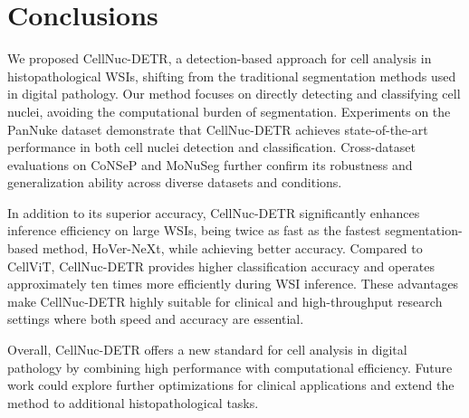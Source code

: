 \section{Conclusions}
We proposed CellNuc-DETR, a detection-based approach for cell analysis in histopathological WSIs, shifting from the traditional segmentation methods used in digital pathology. Our method focuses on directly detecting and classifying cell nuclei, avoiding the computational burden of segmentation. Experiments on the PanNuke dataset demonstrate that CellNuc-DETR achieves state-of-the-art performance in both cell nuclei detection and classification. Cross-dataset evaluations on CoNSeP and MoNuSeg further confirm its robustness and generalization ability across diverse datasets and conditions.

In addition to its superior accuracy, CellNuc-DETR significantly enhances inference efficiency on large WSIs, being twice as fast as the fastest segmentation-based method, HoVer-NeXt, while achieving better accuracy. Compared to CellViT, CellNuc-DETR provides higher classification accuracy and operates approximately ten times more efficiently during WSI inference. These advantages make CellNuc-DETR highly suitable for clinical and high-throughput research settings where both speed and accuracy are essential.

Overall, CellNuc-DETR offers a new standard for cell analysis in digital pathology by combining high performance with computational efficiency. Future work could explore further optimizations for clinical applications and extend the method to additional histopathological tasks.